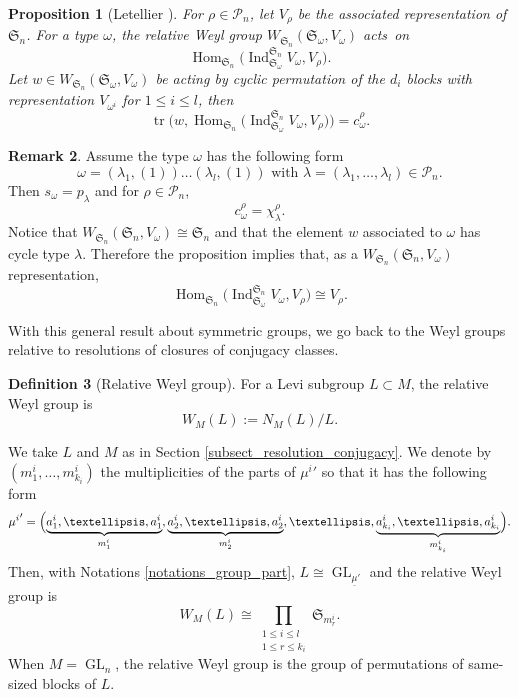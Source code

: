 \documentclass[11pt]{article}
\theoremstyle{definition}
\newtheorem{definition}{Definition}[section]
\newtheorem{remark}[definition]{Remark}
\theoremstyle{plain}
\newtheorem{proposition}[definition]{Proposition}
\DeclareMathOperator{\Hom}{Hom}
\DeclareMathOperator{\Ind}{Ind}
\DeclareMathOperator{\tr}{tr}
\DeclareMathOperator{\GL}{GL}
\newcommand{\Sym}{\mathfrak{S}}
\newcommand{\Part}{\mathcal{P}}
\begin{document}
\begin{proposition}[Letellier {\cite[Prop.\,6.2.5]{Letellier_gl}}]\label{proposition_tr_relative_sym}
For $\rho\in \Part_n$, let $V_{\rho}$ be the asso\-ciated representation of $\Sym_n$. For a type $\omega$, the relative Weyl group $W_{\Sym_n}(\Sym_{\omega},V_{\omega})$ acts~on
\[
\Hom_{\Sym_n} \bigl(\Ind_{\Sym_{\omega}}^{\Sym_n} V_{\omega}, V_{\rho}\bigr).
\]
Let $w\in W_{\Sym_n} \left(\Sym_{\omega},V_{\omega}\right) $ be acting by cyclic permutation of the $d_i$ blocks with representation $V_{\omega^i}$ for $1\le i \le l$, then
\[
\tr \bigl(w, \Hom_{\Sym_n} \bigl(\Ind_{\Sym_{\omega}}^{\Sym_n} V_{\omega}, V_{\rho}\bigr)\bigr) = c_{\omega}^{\rho}.
\]
\end{proposition}
\begin{remark}
Assume the type $\omega$ has the following form
\[
\omega=(\lambda_1, (1))\dots (\lambda_l, (1)) \text{ with } \lambda=(\lambda_1,\dots,\lambda_l)\in\Part_n.
\]
Then $s_{\omega}=p_{\lambda}$ and for $\rho\in\Part_n$,
\[
c^{\rho}_{\omega}= \chi^{\rho}_{\lambda}.
\]
Notice that $W_{\Sym_n}\left(\Sym_n, V_{\omega}\right)\cong \Sym_n$ and that the element $w$ associated to $\omega$ has cycle type $\lambda$. Therefore the proposition implies that, as a $W_{\Sym_n}\left(\Sym_n, V_{\omega}\right)$ representation,
\[
\Hom_{\Sym_n} \bigl(\Ind_{\Sym_{\omega}}^{\Sym_n} V_{\omega}, V_{\rho}\bigr)\cong V_{\rho}.
\]
\end{remark}

With this general result about symmetric groups, we go back to the Weyl groups relative to resolutions of closures of conjugacy classes.

\begin{definition}[Relative Weyl group]
For a Levi subgroup $L\subset M$, the relative Weyl group is
\[
W_{M}(L) := N_{M} (L)/L.
\]
\end{definition}

We take $L$ and $M$ as in Section \ref{subsect_resolution_conjugacy}. We denote by $(m^{i}_1,\dots,m^{i}_{k_{i}})$ the multiplicities of the parts of ${\mu^{i}}'$ so that it has the following form
\[
{\mu^{i}}'=\Bigl(\underbrace{a^{i}_1,\dots,a^{i}_1}_{m^{i}_1},\underbrace{a^{i}_2,\dots,a^{i}_2}_{m^{i}_2},\dots, \underbrace{a^{i}_{k_i},\dots,a^{i}_{k_i}}_{m^{i}_{k_i}}\Bigr).
\]
Then, with Notations \ref{notations_group_part}, $L\cong \GL_{\underline{\mu}'}$ and the relative Weyl group is
\[
W_{M}(L) \cong \prod_{\substack{ 1 \le i \le l \\ 1 \le r \le k_{i}}} \Sym_{m^{i}_{r}}.
\]
When $M=\GL_n$, the relative Weyl group is the group of permutations of same-sized blocks of $L$.
\end{document}
